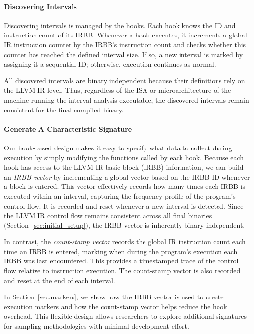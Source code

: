 \paragraph*{Discovering Intervals}

Discovering intervals is managed by the hooks.
Each hook knows the ID and instruction count of its IRBB.
Whenever a hook executes, it increments a global IR instruction counter by the IRBB's instruction count and checks whether this counter has reached the defined interval size.
If so, a new interval is marked by assigning it a sequential ID; otherwise, execution continues as normal.

All discovered intervals are binary independent because their definitions rely on the LLVM IR-level.
Thus, regardless of the ISA or microarchitecture of the machine running the interval analysis executable, the discovered intervals remain consistent for the final compiled binary.

\paragraph*{Generate A Characteristic Signature}

Our hook-based design makes it easy to specify what data to collect during execution by simply modifying the functions called by each hook.
Because each hook has access to the LLVM IR basic block (IRBB) information, we can build an \emph{IRBB vector} by incrementing a global vector based on the IRBB ID whenever a block is entered.
This vector effectively records how many times each IRBB is executed within an interval, capturing the frequency profile of the program's control flow.
It is recorded and reset whenever a new interval is detected.
Since the LLVM IR control flow remains consistent across all final binaries (Section~\ref{sec:initial_setup}), the IRBB vector is inherently binary independent.

In contrast, the \emph{count-stamp vector} records the global IR instruction count each time an IRBB is entered, marking when during the program's execution each IRBB was last encountered.
This provides a timestamped trace of the control flow relative to instruction execution.
The count-stamp vector is also recorded and reset at the end of each interval.

In Section~\ref{sec:markers}, we show how the IRBB vector is used to create execution markers and how the count-stamp vector helps reduce the hook overhead.
This flexible design allows researchers to explore additional signatures for sampling methodologies with minimal development effort.
